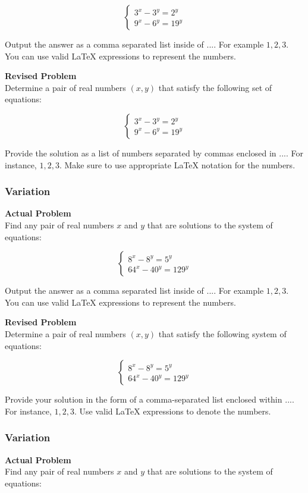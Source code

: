 $$
\begin{cases}
3^x - 3^y = 2^y \\
9^x - 6^y = 19^y
\end{cases}
$$


Output the answer as a comma separated list inside of $\boxed{...}$. For example $\boxed{1, 2, 3}$.
You can use valid LaTeX expressions to represent the numbers.

\textbf{Revised Problem}\\
Determine a pair of real numbers $(x, y)$ that satisfy the following set of equations:

$$
\begin{cases}
3^x - 3^y = 2^y \\
9^x - 6^y = 19^y
\end{cases}
$$

Provide the solution as a list of numbers separated by commas enclosed in $\boxed{...}$. For instance, $\boxed{1, 2, 3}$. Make sure to use appropriate LaTeX notation for the numbers.

\subsubsection{Variation}
\textbf{Actual Problem}\\
Find any pair of real numbers $x$ and $y$ that are solutions to the system of equations:

$$
\begin{cases}
8^x - 8^y = 5^y \\
64^x - 40^y = 129^y
\end{cases}
$$


Output the answer as a comma separated list inside of $\boxed{...}$. For example $\boxed{1, 2, 3}$.
You can use valid LaTeX expressions to represent the numbers.

\textbf{Revised Problem}\\
Determine a pair of real numbers $(x, y)$ that satisfy the following system of equations:

$$
\begin{cases}
8^x - 8^y = 5^y \\
64^x - 40^y = 129^y
\end{cases}
$$

Provide your solution in the form of a comma-separated list enclosed within $\boxed{...}$. For instance, $\boxed{1, 2, 3}$. Use valid LaTeX expressions to denote the numbers.

\subsubsection{Variation}
\textbf{Actual Problem}\\
Find any pair of real numbers $x$ and $y$ that are solutions to the system of equations:

